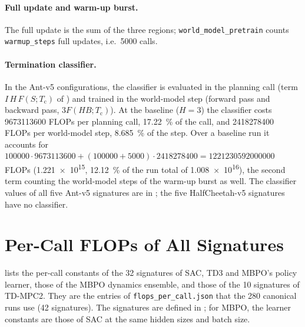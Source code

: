 \paragraph{Full update and warm-up burst.} The full update is the sum of the three regions; \texttt{world\_model\_pretrain} counts \texttt{warmup\_steps} full updates, i.e.\ \num{5000} calls.

\paragraph{Termination classifier.} In the Ant-v5 configurations, the classifier is evaluated in the planning call (term $I\,H\,F(S;T_\mathrm{c})$ of ) and trained in the world-model step (forward pass and backward pass, $3F(HB;T_\mathrm{c})$).
At the baseline ($H=3$) the classifier costs \num{9673113600} FLOPs per planning call, \SI{17.22}{\percent} of the call, and \num{2418278400} FLOPs per world-model step, \SI{8.685}{\percent} of the step.
Over a baseline run it accounts for $\num{100000}\cdot\num{9673113600}+(\num{100000}+\num{5000})\cdot\num{2418278400}=\num{1221230592000000}$ FLOPs (\num{1.221e15}, \SI{12.12}{\percent} of the run total of \num{1.008e16}), the second term counting the world-model steps of the warm-up burst as well.
The classifier values of all five Ant-v5 signatures are in ; the five HalfCheetah-v5 signatures have no classifier.

\section{Per-Call FLOPs of All Signatures}\label{sec:app-flop-table}

 lists the per-call constants of the \num{32} signatures of SAC, TD3 and MBPO's policy learner,  those of the MBPO dynamics ensemble, and  those of the \num{10} signatures of TD-MPC2.
They are the entries of \texttt{flops\_per\_call.json} that the \num{280} canonical runs use (\num{42} signatures).
The signatures are defined in ; for MBPO, the learner constants are those of SAC at the same hidden sizes and batch size.

